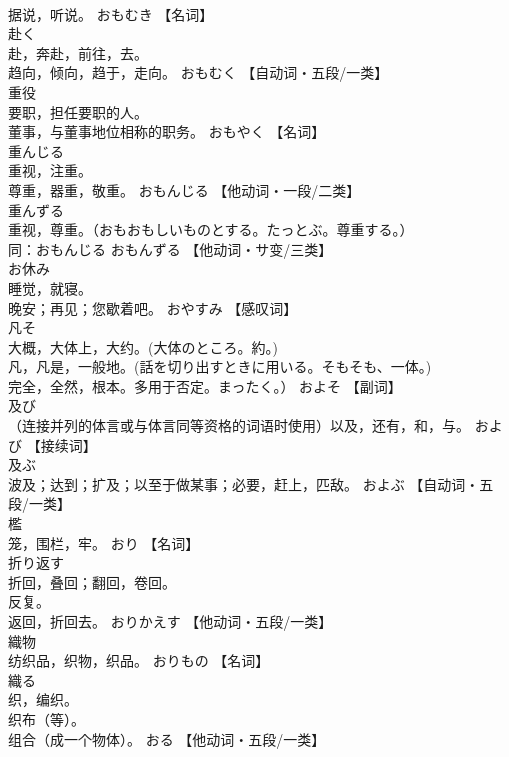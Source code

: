 \documentclass[8pt]{extreport}
\begin{document}
\begin{CJK}{UTF8}{min}
\\	据说，听说。	おもむき		【名词】
\\	赴く	
\\	赴，奔赴，前往，去。 
\\	趋向，倾向，趋于，走向。	おもむく		【自动词・五段/一类】
\\	重役	
\\	要职，担任要职的人。 
\\	董事，与董事地位相称的职务。	おもやく		【名词】
\\	重んじる	
\\	重视，注重。 
\\	尊重，器重，敬重。	おもんじる		【他动词・一段/二类】
\\	重んずる	
\\	重视，尊重。（おもおもしいものとする。たっとぶ。尊重する。） 
\\	同：おもんじる	おもんずる		【他动词・サ变/三类】
\\	お休み	
\\	睡觉，就寝。 
\\	晚安；再见；您歇着吧。	おやすみ		【感叹词】
\\	凡そ	
\\	大概，大体上，大约。(大体のところ。約。) 
\\	凡，凡是，一般地。(話を切り出すときに用いる。そもそも、一体。) 
\\	完全，全然，根本。多用于否定。まったく。）	およそ		【副词】
\\	及び	
\\	（连接并列的体言或与体言同等资格的词语时使用）以及，还有，和，与。	および		【接续词】
\\	及ぶ	
\\	波及；达到；扩及；以至于做某事；必要，赶上，匹敌。	およぶ		【自动词・五段/一类】
\\	檻	
\\	笼，围栏，牢。	おり		【名词】
\\	折り返す	
\\	折回，叠回；翻回，卷回。 
\\	反复。 
\\	返回，折回去。	おりかえす		【他动词・五段/一类】
\\	織物	
\\	纺织品，织物，织品。	おりもの		【名词】
\\	織る	
\\	织，编织。 
\\	织布（等）。 
\\	组合（成一个物体）。	おる		【他动词・五段/一类】

\end{CJK}
\end{document}

